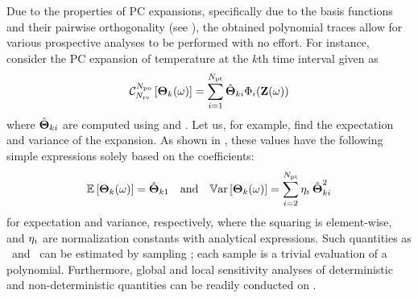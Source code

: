 Due to the properties of PC expansions, specifically due to the basis functions and their pairwise orthogonality (see ), the obtained polynomial traces allow for various prospective analyses to be performed with no effort. For instance, consider the PC expansion of temperature at the $k$th time interval given as
\vspace{-0.2em}%
\begin{equation} \elabel{pc-k}
  \oPC{\vars}{\pcorder}{\vTO_k(\o)} = \sum_{i = 1}^{\pcterms} \pcc{\vTO}_{ki} \pcb_i(\vZ(\o))
\end{equation}
\vspace{-0.2em}%
where $\hat{{\boldsymbol\Theta}}_{ki}$ are computed using  and . Let us, for example, find the expectation and variance of the expansion. As shown in , these values have the following simple expressions solely based on the coefficients:
\vspace{-0.2em}%
\begin{equation} \elabel{pc-moments}
  \oExp{\vTO_k(\o)} = \pcc{\vTO}_{k1} \hspace{1em} \text{and} \hspace{1em} \oVar{\vTO_k(\o)} = \sum_{i = 2}^{\pcterms} \pcn_i \: \pcc{\vTO}_{ki}^2
\end{equation}
\vspace{-0.2em}%
for expectation and variance, respectively, where the squaring is element-wise, and $\eta_i$ are normalization constants with analytical expressions. Such quantities as \cdfs\ and \pdfs\ can be estimated by sampling ; each sample is a trivial evaluation of a polynomial. Furthermore, global and local sensitivity analyses of deterministic and non-deterministic quantities can be readily conducted on .
